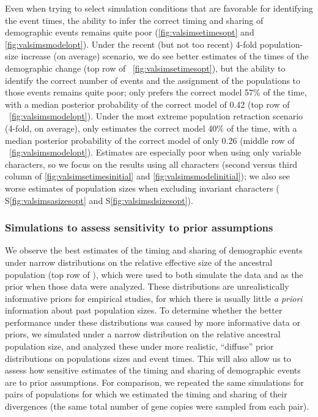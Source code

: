 Even when trying to select simulation conditions that are favorable for
identifying the event times, the ability to infer the correct timing and
sharing of demographic events remains quite poor
(\figs \ref{fig:valsimsetimesopt} and \ref{fig:valsimsmodelopt}).
Under the recent (but not too recent) 4-fold population-size increase (on
average) scenario, we do see better estimates of the times of the demographic
change
(top row of \fig{}~\ref{fig:valsimsetimesopt}),
but the ability to identify the correct number of events and the assignment of
the populations to those events remains quite poor;
\ecoevolity only prefers the correct model 57\% of the time, with
a median posterior probability of the correct model of 0.42
(top row of \fig{}~\ref{fig:valsimsmodelopt}).
Under the most extreme population retraction scenario (4-fold, on average),
\ecoevolity only estimates the correct model 40\% of the time, with a median
posterior probability of the correct model of only 0.26
(middle row of \fig{}~\ref{fig:valsimsmodelopt}).
Estimates are especially poor when using only variable characters,
so we focus on the results using all characters
(second versus third column of \figs
\ref{fig:valsimsetimesinitial}
and
\ref{fig:valsimsmodelinitial});
we also see worse estimates of population sizes when excluding invariant
characters
(\figs
S\ref{fig:valsimsasizesopt}
and 
S\ref{fig:valsimsdsizesopt}).

\ifembed{

}{}

\ifembed{

}{}


\subsubsection{Simulations to assess sensitivity to prior assumptions}

We observe the best estimates of the timing and sharing of demographic
events under narrow distributions on the relative effective size of the
ancestral population
(top row of \figs
{}),
which were used to both simulate the data and as the prior
when those data were analyzed.
These distributions are unrealistically informative priors for empirical
studies, for which there is usually little \emph{a priori} information about
past population sizes.
To determine whether the better performance under these distributions was
caused by more informative data or priors, we simulated \datasets under a
narrow distribution on the relative ancestral population size, and analyzed
these \datasets under more realistic, ``diffuse'' prior distributions on
populations sizes and event times.
This will also allow us to assess how sensitive estimates of the timing and
sharing of demographic events are to prior assumptions.
For comparison, we repeated the same simulations for pairs of populations for
which we estimated the timing and sharing of their divergences (the same total
number of gene copies were sampled from each pair).

